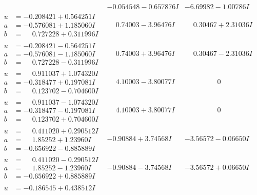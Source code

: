 \documentclass[1p]{elsarticle_modified}
\theoremstyle{definition}
\begin{document}
$$\begin{array}{c|c|c}
 & -0.054548 - 0.657876 I & -6.69982 - 1.00786 I \\ \hline\begin{aligned}
u &= -0.208421 + 0.564251 I \\
a &= -0.576081 + 1.185060 I \\
b &= \phantom{-}0.727228 + 0.311996 I\end{aligned}
 & \phantom{-}0.74003 - 3.96476 I & \phantom{-}0.30467 + 2.31036 I \\ \hline\begin{aligned}
u &= -0.208421 - 0.564251 I \\
a &= -0.576081 - 1.185060 I \\
b &= \phantom{-}0.727228 - 0.311996 I\end{aligned}
 & \phantom{-}0.74003 + 3.96476 I & \phantom{-}0.30467 - 2.31036 I \\ \hline\begin{aligned}
u &= \phantom{-}0.911037 + 1.074320 I \\
a &= -0.318477 + 0.197081 I \\
b &= \phantom{-}0.123702 - 0.704600 I\end{aligned}
 & \phantom{-}4.10003 - 3.80077 I & \phantom{-0.000000 } 0 \\ \hline\begin{aligned}
u &= \phantom{-}0.911037 - 1.074320 I \\
a &= -0.318477 - 0.197081 I \\
b &= \phantom{-}0.123702 + 0.704600 I\end{aligned}
 & \phantom{-}4.10003 + 3.80077 I & \phantom{-0.000000 } 0 \\ \hline\begin{aligned}
u &= \phantom{-}0.411020 + 0.290512 I \\
a &= \phantom{-}1.85252 + 1.23960 I \\
b &= -0.656922 - 0.885889 I\end{aligned}
 & -0.90884 + 3.74568 I & -3.56572 - 0.06650 I \\ \hline\begin{aligned}
u &= \phantom{-}0.411020 - 0.290512 I \\
a &= \phantom{-}1.85252 - 1.23960 I \\
b &= -0.656922 + 0.885889 I\end{aligned}
 & -0.90884 - 3.74568 I & -3.56572 + 0.06650 I \\ \hline\begin{aligned}
u &= -0.186545 + 0.438512 I \\

\end{aligned}
\end{array}$$
\end{document}
